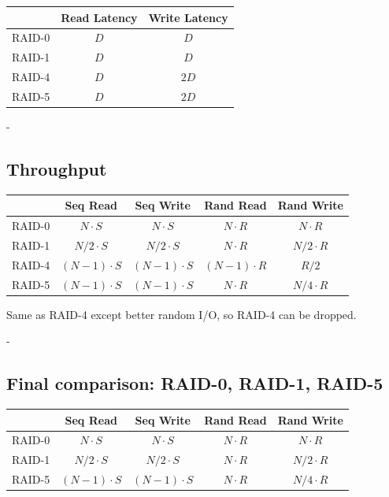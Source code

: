 \documentclass[11pt,a4paper]{article}
\makeatletter
\newcommand{\keepspace}[1]{\par\penalty-100\begingroup
  \setlength{\dimen@}{#1}\dimen@ii\pagegoal\advance\dimen@ii-\pagetotal
  \ifdim\dimen@>\dimen@ii\ifdim\dimen@ii>\z@\vfil\fi\break\fi\endgroup}
\makeatother
\begin{document}
\begin{center}
\renewcommand{\arraystretch}{1.25}
\begin{tabular}{@{}lcc@{}}
\toprule
 & \textbf{Read Latency} & \textbf{Write Latency} \\
\midrule
RAID-0 & \(D\) & \(D\) \\
RAID-1 & \(D\) & \(D\) \\
RAID-4 & \(D\) & \(2D\) \\
RAID-5 & \(D\) & \(2D\) \\
\bottomrule
\end{tabular}
\end{center}

\keepspace{9\baselineskip}
\subsection{Throughput}

\begin{center}
\renewcommand{\arraystretch}{1.25}
\begin{tabular}{@{}lcccc@{}}
\toprule
 & \textbf{Seq Read} & \textbf{Seq Write} & \textbf{Rand Read} & \textbf{Rand Write} \\
\midrule
RAID-0 & \(N\cdot S\) & \(N\cdot S\) & \(N\cdot R\) & \(N\cdot R\) \\
RAID-1 & \(N/2\cdot S\) & \(N/2\cdot S\) & \(N\cdot R\) & \(N/2\cdot R\) \\
RAID-4 & \((N-1)\cdot S\) & \((N-1)\cdot S\) & \((N-1)\cdot R\) & \(R/2\) \\
RAID-5 & \((N-1)\cdot S\) & \((N-1)\cdot S\) & \(N\cdot R\) & \(N/4\cdot R\) \\
\bottomrule
\end{tabular}
\end{center}

\begin{keybox}
Same as RAID-4 except better random I/O, so RAID-4 can be dropped.
\end{keybox}

\keepspace{9\baselineskip}
\subsection{Final comparison: RAID-0, RAID-1, RAID-5}

\begin{center}
\renewcommand{\arraystretch}{1.25}
\begin{tabular}{@{}lcccc@{}}
\toprule
 & \textbf{Seq Read} & \textbf{Seq Write} & \textbf{Rand Read} & \textbf{Rand Write} \\
\midrule
RAID-0 & \(N\cdot S\) & \(N\cdot S\) & \(N\cdot R\) & \(N\cdot R\) \\
RAID-1 & \(N/2\cdot S\) & \(N/2\cdot S\) & \(N\cdot R\) & \(N/2\cdot R\) \\
RAID-5 & \((N-1)\cdot S\) & \((N-1)\cdot S\) & \(N\cdot R\) & \(N/4\cdot R\) \\
\bottomrule
\end{tabular}
\end{center}
\end{document}
